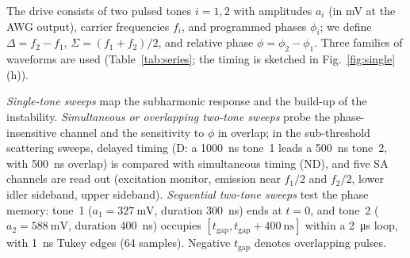 \documentclass[aps,prb,reprint,superscriptaddress,floatfix]{revtex4-2}
\newcommand{\tgap}{t_{\mathrm{gap}}}
\begin{document}
The drive consists of two pulsed tones $i=1,2$ with amplitudes $a_i$ (in mV at the AWG output), carrier frequencies $f_i$, and programmed phases $\phi_i$; we define $\Delta=f_2-f_1$, $\Sigma=(f_1+f_2)/2$, and relative phase $\phi=\phi_2-\phi_1$. Three families of waveforms are used (Table~\ref{tab:series}; the timing is sketched in Fig.~\ref{fig:single}(h)).

\emph{Single-tone sweeps} map the subharmonic response and the build-up of the instability. \emph{Simultaneous or overlapping two-tone sweeps} probe the phase-insensitive channel and the sensitivity to $\phi$ in overlap; in the sub-threshold scattering sweeps, delayed timing (D: a \SI{1000}{\nano\second} tone~1 leads a \SI{500}{\nano\second} tone~2, with \SI{500}{\nano\second} overlap) is compared with simultaneous timing (ND), and five SA channels are read out (excitation monitor, emission near $f_1/2$ and $f_2/2$, lower idler sideband, upper sideband). \emph{Sequential two-tone sweeps} test the phase memory: tone~1 ($a_1=\SI{327}{\milli\volt}$, duration \SI{300}{\nano\second}) ends at $t=0$, and tone~2 ($a_2=\SI{588}{\milli\volt}$, duration \SI{400}{\nano\second}) occupies $[\tgap,\tgap+\SI{400}{\nano\second}]$ within a \SI{2}{\micro\second} loop, with \SI{1}{\nano\second} Tukey edges (64 samples). Negative $\tgap$ denotes overlapping pulses.
\end{document}
